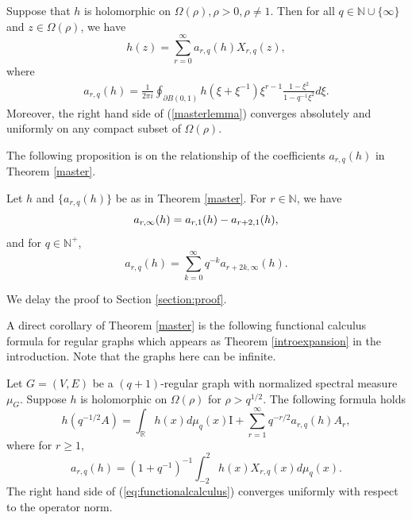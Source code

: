 \documentclass{article}
\begin{document}
\begin{theorem}\label{master}
    Suppose that $h$ is holomorphic on $\Omega(\rho), \rho>0, \rho\neq 1$.
    Then for all $q\in \mathbb{N}\cup \{\infty\}$ and $z \in \Omega(\rho)$, we have
    \begin{equation}\label{masterlemma}
        h(z)=\sum_{r=0}^{\infty}a_{r,q}(h)X_{r,q}(z),
    \end{equation}
    where
    \begin{equation}\label{crq}
    \begin{aligned}
        a_{r,q}(h)=\frac{1}{2\pi i}\oint_{\partial B(0,1)} h(\xi+\xi^{-1})\xi^{r-1}\frac{1-\xi^2}{1-q^{-1}\xi^2}d\xi.
    \end{aligned}
    \end{equation}
    Moreover, the right hand side of (\ref{masterlemma}) converges absolutely and uniformly on any compact subset of $\Omega(\rho)$.
\end{theorem}

The following proposition is on the relationship of the coefficients $a_{r,q}(h)$ in Theorem \ref{master}.

\begin{proposition}\label{xrqhuxiangzhuanhuan}
    Let $h$ and $\{a_{r,q}(h)\}$ be as in Theorem \ref{master}. For $r\in \mathbb{N}$,  we have
\begin{equation}{\label{cheby1tocheb2}}
   a_{r,\infty}(h)=a_{r,1}(h)-a_{r+2,1}(h),
\end{equation}
and for $q\in \mathbb{N}^+$,
\begin{equation}\label{chebinftytochebq}
   a_{r,q}(h)=\sum_{k=0}^{\infty}
 q^{-k}a_{r+2k,\infty}(h).
\end{equation}
\end{proposition}

We delay the proof to Section \ref{section:proof}. 

A direct corollary of Theorem \ref{master} is the following functional calculus formula for regular graphs which appears as Theorem \ref{introexpansion} in the introduction. Note that the graphs here can be infinite.
\begin{theorem}\label{kernel}
    Let $G=(V,E)$ be a $(q+1)$-regular graph with normalized spectral measure $\mu_G$.
    Suppose $h$  is holomorphic on $\Omega(\rho)$ for $\rho>q^{1/2}$.
    The following formula holds
    \begin{equation}\label{eq:functionalcalculus}
        h(q^{-1/2}A)=\int_{\mathbb{R}} h(x)d\mu_q(x)\mathrm{I}+\sum_{r=1}^{\infty}q^{-r/2}a_{r,q}(h) A_r,
    \end{equation}
    where for $r\geq 1$,
    \begin{equation*}
        a_{r,q}(h)=(1+q^{-1})^{-1}\int_{-2}^{2}h(x)X_{r,q}(x)d\mu_q(x).
    \end{equation*}
The right hand side of (\ref{eq:functionalcalculus}) converges uniformly with respect to the operator norm.
\end{theorem}
\end{document}
